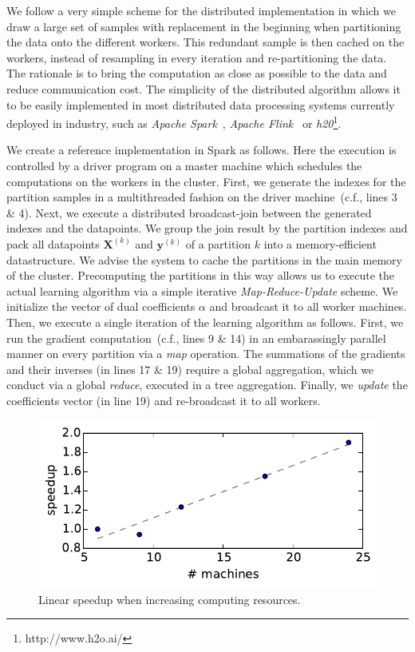 \documentclass{article} %
\renewcommand{\vec}[1]{\mathbf{#1}}
\begin{document}
We follow a very simple scheme for the distributed implementation in which we draw a large set of samples with replacement in the beginning when partitioning the data onto the different workers. This redundant sample is then cached on the workers, instead of resampling in every iteration and re-partitioning the data. The rationale is to bring the computation as close as possible to the data and reduce communication cost. The simplicity of the distributed algorithm allows it to be easily implemented in most distributed data processing systems currently deployed in industry, such as \textit{Apache Spark}~\cite{Zaharia2012}, \textit{Apache Flink}~\cite{Alexandrov2014} or \textit{h20}\footnote{http://www.h2o.ai/}. 

We create a reference implementation in Spark as follows. Here the execution is controlled by a driver program on a master machine which schedules the computations on the workers in the cluster. First, we generate the indexes for the partition samples in a multithreaded fashion on the driver machine~(c.f., lines 3 \& 4). Next, we execute a distributed broadcast-join between the generated indexes and the datapoints. We group the join result by the partition indexes and pack all datapoints $\vec{X}^{(k)}$ and $\vec{y}^{(k)}$ of a partition $k$ into a memory-efficient datastructure. We advise the system to cache the partitions in the main memory of the cluster. Precomputing the partitions in this way allows us to execute the actual learning algorithm via a simple iterative \textit{Map-Reduce-Update} scheme. We initialize the vector of dual coefficients $\alpha$ and broadcast it to all worker machines. Then, we execute a single iteration of the learning algorithm as follows. First, we run the gradient computation~(c.f., lines 9 \& 14) in an embarassingly parallel manner on every partition via a \textit{map} operation. The summations of the gradients and their inverses (in lines 17 \& 19) require a global aggregation, which we conduct via a global \textit{reduce}, executed in a tree aggregation. Finally, we \textit{update} the coefficients vector (in line 19) and re-broadcast it to all workers. 

\begin{figure}[!ht]
  \centering
    \includegraphics[width=0.6\columnwidth]{imgs/linear-speedup}
     \caption{Linear speedup when increasing computing resources.}
  \label{fig:scalability}
\end{figure}
\end{document}
